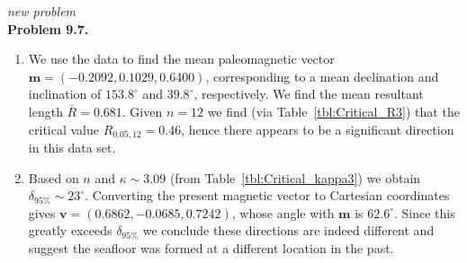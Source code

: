 {\it new problem}\\

\noindent
\bf{Problem 9.7.} \\

\begin{enumerate}[label=\alph*)]
\item We use the data to find the mean paleomagnetic vector
$\mathbf{m} = (-0.2092, 0.1029, 0.6400)$, corresponding to a mean declination and inclination of $153.8^{\circ}$ and $39.8^{\circ}$,
respectively.  We find the mean resultant length $\bar{R} = 0.681$.  Given $n = 12$ we find (via Table~\ref{tbl:Critical_R3}) that
the critical value $R_{0.05,12} = 0.46$, hence there appears to be a significant direction in this data set.

\item Based on $n$ and $\kappa \sim 3.09$ (from Table~\ref{tbl:Critical_kappa3}) we obtain $\delta_{95\%} \sim 23^{\circ}$.
Converting the present magnetic vector to Cartesian coordinates gives $\mathbf{v} = (0.6862, -0.0685, 0.7242)$, whose
angle with $\mathbf{m}$ is $62.6^{\circ}$. Since this greatly exceeds $\delta_{95\%}$ we conclude these directions are indeed
different and suggest the seafloor was formed at a different location in the past.
\end{enumerate}
